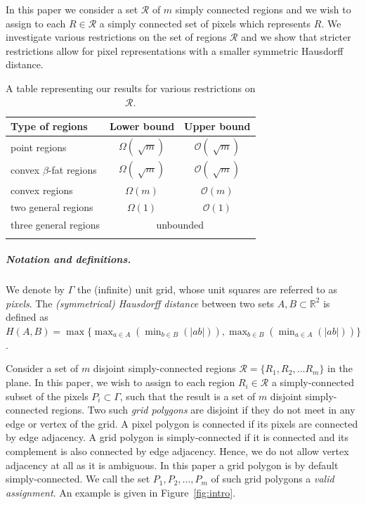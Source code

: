 \documentclass[a4paper, 11pt]{article}
\newcommand{\mremark}[3]{\textcolor{blue}{\textsc{#1 #2:}} \textcolor{SeaGreen}{\textsf{#3}}}
\newcommand{\jordi}[2][says]{\mremark{Jordi}{#1}{#2}}
\newcommand{\bigo}{\ensuremath{\mathcal O}}
\newcommand{\R}{\mathbb{R}}
\begin{document}
In this paper we consider a set $\mathcal{R}$ of $m$ simply connected regions and we wish to assign to each $R \in \mathcal{R}$ a simply connected set of pixels which represents $R$.
We investigate various restrictions on the set of regions $\mathcal{R}$ and we show that stricter restrictions allow for pixel representations with a smaller symmetric Hausdorff distance.



\begin{table}[H]
\begin{tabular}{lcc}
\toprule
Type of regions & Lower bound & Upper bound  \\ \midrule
point regions & $\Omega(\sqrt[]{m}) $ & $\bigo(\sqrt[]{m})$ \\
convex $\beta$-fat regions & $\Omega(\sqrt[]{m}) $ & $\bigo(\sqrt[]{m})$ \\
convex regions & $\Omega(m) $ & $\bigo(m)$ \\
two general regions &  $\Omega(1)$ & $\bigo(1)$\\
three general regions &  \multicolumn{2}{c}{unbounded}\\
\bottomrule\\
\end{tabular}
\caption{A table representing our results for various restrictions on $\mathcal{R}$.}
\label{table:results}
\end{table}

\subparagraph{Notation and definitions.}
We denote by $\Gamma$ the (infinite) unit grid, whose unit squares are referred to as \emph{pixels}.
The {\em (symmetrical) Hausdorff distance} between two sets $A, B \subset \R^2$ is defined as $H(A, B) = \max \{\max_{a \in A}(\min_{b \in B}(|ab|)), \max_{b \in B}(\min_{a \in A}(|ab|))\}$.

Consider a set of $m$ disjoint simply-connected regions $\mathcal{R} = \{R_1, R_2, \ldots R_m \}$ in the plane.
In this paper, we wish to assign to each region $R_i \in \mathcal{R}$ a simply-connected subset of the pixels $P_i \subset \Gamma$, such that the result is a set of $m$ disjoint simply-connected regions.
Two such \emph{grid polygons} are disjoint if they do not meet in any edge or vertex of the grid. A pixel polygon is connected if its pixels are connected by edge adjacency. A grid polygon is simply-connected if it is connected and its complement is also connected by edge adjacency.
Hence, we do not allow vertex adjacency at all as it is ambiguous. In this paper a grid polygon is by default simply-connected.
We call the set $P_1, P_2, \ldots, P_m$ of such grid polygons a \emph{valid assignment}. An example is given in Figure~\ref{fig:intro}.
\end{document}
